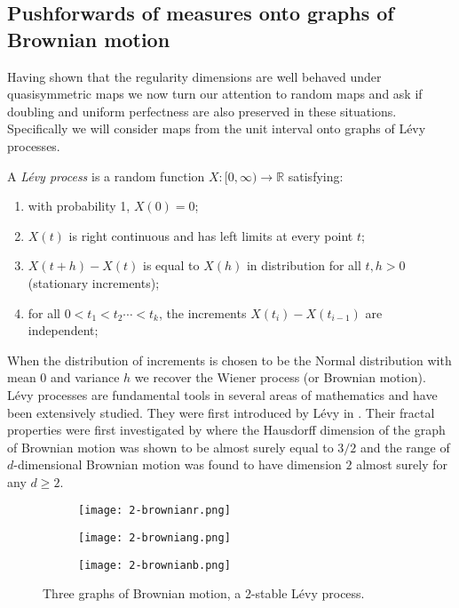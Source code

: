 \subsection{Pushforwards of measures onto graphs of Brownian motion}


Having shown that the regularity dimensions are well behaved under quasisymmetric maps we now turn our attention to random maps and ask if doubling and uniform perfectness are also preserved in these situations. Specifically we will consider maps from the unit interval onto graphs of L\'evy processes.

A \textit{L\'evy process} is a random function $X : [0,\infty) \rightarrow \mathbb{R}$ satisfying:
\begin{enumerate}
	\item with probability 1, $X(0) = 0$;
	
	\item $X(t)$ is right continuous and has left limits at every point $t$;
	
	\item $X(t+h) - X(t)$ is equal to $X(h)$ in distribution for all $t,h >0$ (stationary increments);
	
	\item for all $0<t_1 < t_2 \cdots < t_k$, the increments $X(t_i) - X(t_{i-1})$ are independent;
	
\end{enumerate}

When the distribution of increments is chosen to be the Normal distribution with mean 0 and variance $h$ we recover the Wiener process (or Brownian motion). L\'evy processes are fundamental tools in several areas of mathematics and have been extensively studied. They were first introduced by L\'evy in \cite{levy}. Their fractal properties were first investigated by \cite{taylor} where the Hausdorff dimension of the graph of Brownian motion was shown to be almost surely equal to $3/2$ and the range of $d$-dimensional Brownian motion was found to have dimension $2$ almost surely for any $d \ge 2$. 

\begin{figure}[htbp]
	\centering
	\begin{subfigure}{0.3\textwidth}
		\centering
		\texttt{[image: 2-brownianr.png]}
	\end{subfigure}%
	\begin{subfigure}{.3\textwidth}
		\centering
		\texttt{[image: 2-browniang.png]}
	\end{subfigure}%
	\begin{subfigure}{.3\textwidth}
		\centering
		\texttt{[image: 2-brownianb.png]}
	\end{subfigure}
	\caption{Three graphs of Brownian motion, a 2-stable L\'evy process.}
	\label{fig:brownian}
\end{figure}

